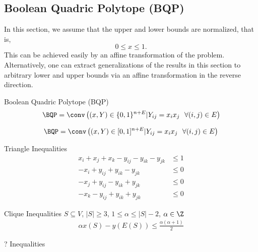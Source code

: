 \subsection{Boolean Quadric Polytope (BQP)}
In this section, we assume that the upper and lower bounds are normalized, that is, 
$$
0 \leq x \leq 1.
$$
This can be achieved easily by an affine transformation of the problem.  Alternatively, one can extract generalizations of the results in this section to arbitrary lower and upper bounds via an affine transformation in the reverse direction.

\begin{general}{Boolean Quadric Polytope (BQP)}{}
\begin{equation}
\BQP = \conv\left( (x,Y) \in \{0,1\}^{n+ E} | Y_{ij} = x_i x_j \ \ \forall (i,j) \in E \right)
\end{equation}
\end{general}

\begin{theorem}{}{}
\begin{equation}
\BQP = \conv\left( (x,Y) \in [0,1]^{n+ E} | Y_{ij} = x_i x_j \ \ \forall (i,j) \in E \right)
\end{equation}
\end{theorem}


\cite{Akshay-Gupte2019}
\begin{general}{Triangle Inequalities}{}
\begin{align*}
x_i + x_j + x_k - y_{ij} - y_{ik} - y_{jk} & \leq 1\\
- x_i + y_{ij} + y_{ik} - y_{jk} &\leq 0\\
- x_j + y_{ij} - y_{ik} + y_{jk}& \leq 0\\
- x_k - y_{ij} + y_{ik} + y_{jk} &\leq 0
\end{align*}
\end{general}

\begin{general}{Clique Inequalities}{}
$S \subseteq V$, $|S| \geq 3$, $1 \leq \alpha \leq |S|-2$, $\alpha \in \Z$
\begin{align*}
\alpha x(S) - y(E(S)) \leq \frac{\alpha(\alpha+1)}{2}
\end{align*}
\end{general}

\begin{general}{? Inequalities}{}

\end{general}

